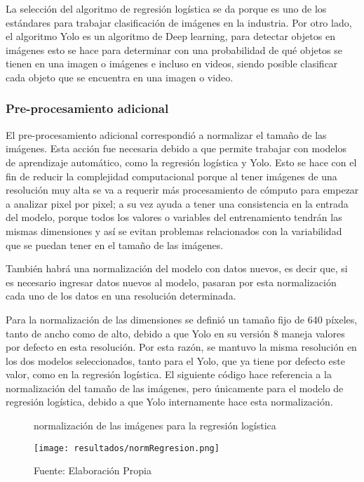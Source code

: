 La selección del algoritmo de regresión logística se da porque es uno de los estándares para trabajar clasificación de imágenes en la industria. Por otro lado, el algoritmo Yolo es un algoritmo de Deep learning, para detectar objetos en imágenes esto se hace para determinar con una probabilidad de qué objetos se tienen en una imagen o imágenes e incluso en videos, siendo posible clasificar cada objeto que se encuentra en una imagen o video.

\subsubsection{Pre-procesamiento adicional}

El pre-procesamiento adicional correspondió a normalizar el tamaño de las imágenes. Esta acción fue necesaria debido a que permite trabajar con modelos de aprendizaje automático, como la regresión logística y Yolo. Esto se hace con el fin de reducir la complejidad computacional porque al tener imágenes de una resolución muy alta se va a requerir más procesamiento de cómputo para empezar a analizar pixel por pixel; a su vez ayuda a tener una consistencia en la entrada del modelo, porque todos los valores o variables del entrenamiento tendrán las mismas dimensiones y así se evitan problemas relacionados con la variabilidad que se puedan tener en el tamaño de las imágenes.

También habrá una normalización del modelo con datos nuevos, es decir que, si es necesario ingresar datos nuevos al modelo, pasaran por esta normalización cada uno de los datos en una resolución determinada.

\newpage

Para la normalización de las dimensiones se definió un tamaño fijo de 640 píxeles, tanto de ancho como de alto, debido a que Yolo en su versión 8 maneja valores por defecto en esta resolución. Por esta razón, se mantuvo la misma resolución en los dos modelos seleccionados, tanto para el Yolo, que ya tiene por defecto este valor, como en la regresión logística. El siguiente código hace referencia a la normalización del tamaño de las imágenes, pero únicamente para el modelo de regresión logística, debido a que Yolo internamente hace esta normalización.

\begin{figure}[h]
\centering
\caption{normalización de las imágenes para la regresión logística}
\texttt{[image: resultados/normRegresion.png]}
\caption*{\footnotesize Fuente: Elaboración Propia}
\label{fig:figuraNormRegresion}
\end{figure}

